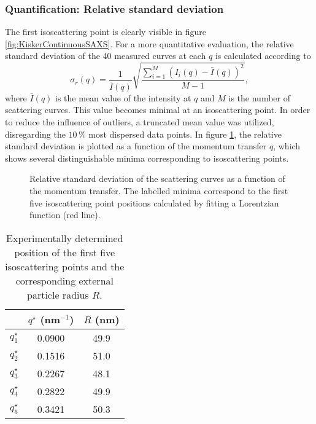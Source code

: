 \subsubsection{Quantification: Relative standard deviation}
The first isoscattering point is clearly visible in figure \ref{fig:KiskerContinuousSAXS}. For a more quantitative evaluation, the relative standard deviation of the 40 measured curves at each \(q\) is calculated according to
\begin{equation}
\sigma_r (q)=\frac{1}{\bar{I}(q)}\sqrt{\frac{\sum^{M}_{i=1} (I_i(q) -\bar{I} (q))^2 }{M-1}} ,
\end{equation}
where \(\bar{I} (q)\) is the mean value of the intensity at \(q\) and \( M \) is the number of scattering curves. This value becomes minimal at an isoscattering point. In order to reduce the influence of outliers, a truncated mean value was utilized, disregarding the \(10\,\%\) most dispersed data points. In figure \ref{fig:KiskerIsopoint}, the relative standard deviation is plotted as a function of the momentum transfer \(q\), which shows several distinguishable minima corresponding to isoscattering points.

\begin{figure}%
	\centering
		
		\caption{Relative standard deviation of the scattering curves as a function of the momentum transfer. The labelled minima correspond to the first five isoscattering point positions calculated by fitting a Lorentzian function (red line).}
		\label{fig:KiskerIsopoint}
\end{figure}

\begin{table}
\caption{Experimentally determined position of the first five isoscattering points and the corresponding external particle radius $R$.}
\begin{tabular}{l|cc}
 & \( q^{\star} \) (nm\(^{-1}\))    &  \(R\) (nm) \\
\hline
 \(q^{\star}_1\) &  0.0900 & 49.9 \\
 \(q^{\star}_2\) &  0.1516 & 51.0  \\
 \(q^{\star}_3\) &  0.2267 & 48.1   \\
 \(q^{\star}_4\) &  0.2822 & 49.9    \\
 \(q^{\star}_5\) &  0.3421 & 50.3     \\
\end{tabular}
\label{tab:isopoint_Kisker}
\end{table}

